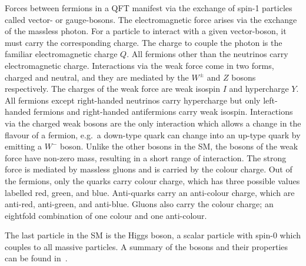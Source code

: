 Forces between fermions in a QFT manifest via the exchange of spin-1 particles called vector- or gauge-bosons.
The electromagnetic force arises via the exchange of the massless photon.
For a particle to interact with a given vector-boson, it must carry the corresponding charge.
The charge to couple the photon is the familiar electromagnetic charge $Q$.
All fermions other than the neutrinos carry electromagnetic charge.
Interactions via the weak force come in two forms, charged and neutral, and they are mediated by the $W^\pm$ and $Z$ bosons respectively.
The charges of the weak force are weak isospin $I$ and hypercharge $Y$.
All fermions except right-handed neutrinos carry hypercharge but only left-handed fermions and right-handed antifermions carry weak isospin.
Interactions via the charged weak bosons are the only interaction which allows a change in the flavour of a fermion, e.g.\ a down-type quark can change into an up-type quark by emitting a $W^-$ boson.
Unlike the other bosons in the SM, the bosons of the weak force have non-zero mass, resulting in a short range of interaction.
The strong force is mediated by massless gluons and is carried by the colour charge.
Out of the fermions, only the quarks carry colour charge, which has three possible values labelled red, green, and blue.
Anti-quarks carry an anti-colour charge, which are anti-red, anti-green, and anti-blue.
Gluons also carry the colour charge; an eightfold combination of one colour and one anti-colour.

The last particle in the SM is the Higgs boson, a scalar particle with spin-0 which couples to all massive particles.
A summary of the bosons and their properties can be found in~.

